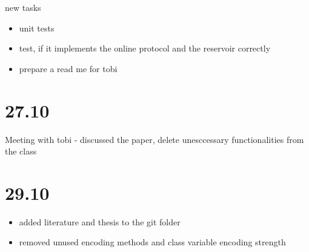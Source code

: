 new tasks
\begin{itemize}
    \item unit tests
    \item test, if it implements the online protocol and the reservoir correctly
    \item prepare a read me for tobi
\end{itemize}

\section*{27.10}
Meeting with tobi - discussed the paper, delete unesccessary functionalities from the class

\section*{29.10}
\begin{itemize}
    \item added literature and thesis to the git folder
    \item removed unused encoding methods and class variable encoding strength
\end{itemize}